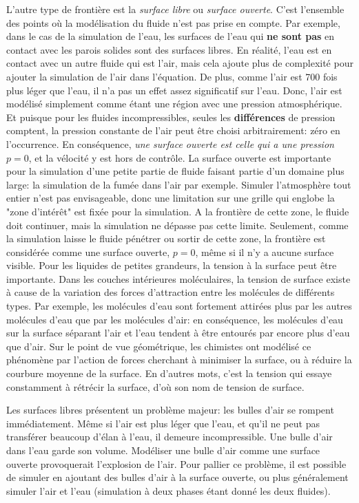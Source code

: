 \documentclass[11pt]{article}
\begin{document}
L'autre type de frontière est la \textit{surface libre} ou \textit{surface ouverte}. C'est l'ensemble des points où la modélisation du fluide n'est pas prise en compte. Par exemple, dans le cas de la simulation de l'eau, les surfaces de l'eau qui \textbf{ne sont pas} en contact avec les parois solides sont des surfaces libres. En réalité, l'eau est en contact avec un autre fluide qui est l'air, mais cela ajoute plus de complexité  pour ajouter la simulation de l'air dans l'équation. De plus, comme l'air est 700 fois plus léger que l'eau, il n'a pas un effet assez significatif sur l'eau. Donc, l'air est modélisé simplement comme étant une région avec une pression atmosphérique. Et puisque pour les fluides incompressibles, seules les \textbf{ différences} de pression comptent, la pression constante de l'air peut être choisi arbitrairement: zéro en l’occurrence. En conséquence, \textit{une surface ouverte est celle qui a une pression} $ p = 0 $, et la vélocité y est hors de contrôle.\newline
La surface ouverte est importante pour la simulation d'une petite partie de fluide faisant partie d'un domaine plus large: la simulation de la fumée dans l'air par exemple. Simuler l'atmosphère tout entier n'est pas envisageable, donc une limitation sur une grille qui englobe la "zone d'intérêt" est fixée pour la simulation. A la frontière de cette zone, le fluide doit continuer, mais la simulation ne dépasse pas cette limite. Seulement, comme la simulation laisse le fluide pénétrer ou sortir de cette zone, la frontière est considérée comme une surface ouverte, $ p = 0 $, même si il n'y a aucune surface visible.\newline
Pour les liquides de petites grandeurs, la tension à la surface peut être importante. Dans les couches intérieures moléculaires, la tension de surface existe à cause de la variation des forces d'attraction entre les molécules de différents types. Par exemple, les molécules d'eau sont fortement attirées plus par les autres molécules d'eau que par les molécules d'air: en conséquence, les molécules d'eau sur la surface séparant l'air et l'eau tendent à être entourés par encore plus d'eau que d'air. Sur le point de vue géométrique, les chimistes ont modélisé ce phénomène par l'action de forces cherchant à minimiser la surface, ou à réduire la courbure moyenne de la surface. En d'autres mots, c'est la tension qui essaye constamment à rétrécir la surface, d'où son nom de tension de surface. \newline

Les surfaces libres présentent un problème majeur: les bulles d'air se rompent immédiatement. Même si l'air est plus léger que l'eau, et qu'il ne peut pas transférer beaucoup d'élan à l'eau, il demeure incompressible. Une bulle d'air dans l'eau garde son volume. Modéliser une bulle d'air comme une surface ouverte provoquerait l'explosion de l'air. Pour pallier ce problème, il est possible de simuler en ajoutant des bulles d'air à la surface ouverte, ou plus généralement simuler l'air et l'eau (simulation à deux phases étant donné les deux fluides).
\end{document}
